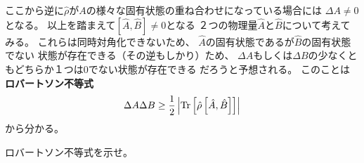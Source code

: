 \documentclass[a4paper, 10pt, uplatex]{jsarticle}
\begin{document}
ここから逆に$\hat{\rho}$が$A$の様々な固有状態の重ね合わせになっている場合には
$\Delta A \neq 0$となる。
以上を踏まえて$\left[ \hat{A}, \hat{B} \right] \neq 0$となる
２つの物理量$\hat{A}$と$\hat{B}$について考えてみる。
これらは同時対角化できないため、
$\hat{A}$の固有状態であるが$\hat{B}$の固有状態でない
状態が存在できる（その逆もしかり）ため、
$\Delta A$もしくは$\Delta B$の少なくともどちらか１つは0でない状態が存在できる
だろうと予想される。
このことは\textbf{ロバートソン不等式}
\begin{align}
	\Delta A \Delta B
	\geq \frac{1}{2} \left| \operatorname*{Tr} \left[ \hat{\rho}
	\left[ \hat{A}, \hat{B} \right] \right] \right|
	\label{eq:ロバートソン不等式}
\end{align}
から分かる。

\begin{problem}
	ロバートソン不等式を示せ。

	\tcblower


\end{problem}
\end{document}
